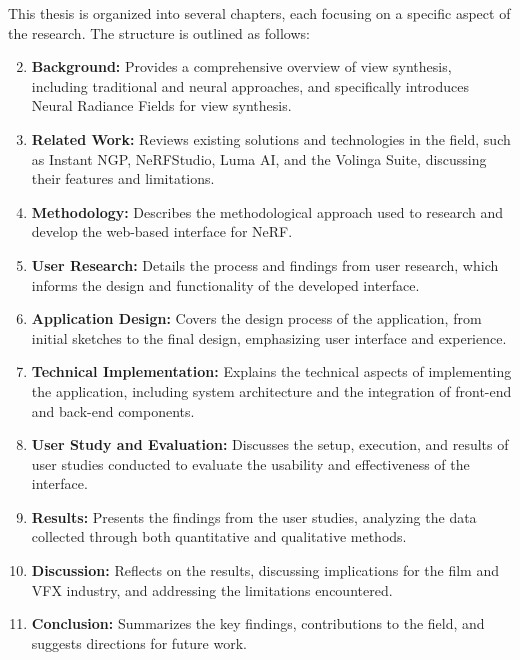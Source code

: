 This thesis is organized into several chapters, each focusing on a specific aspect of the research.
The structure is outlined as follows:

\begin{enumerate}
    \setcounter{enumi}{1}
    \item \textbf{Background:} Provides a comprehensive overview of view synthesis, including traditional and neural approaches, and specifically introduces Neural Radiance Fields for view synthesis.
    \item \textbf{Related Work:} Reviews existing solutions and technologies in the field, such as Instant NGP, NeRFStudio, Luma AI, and the Volinga Suite, discussing their features and limitations.
    \item \textbf{Methodology:} Describes the methodological approach used to research and develop the web-based interface for NeRF.
    \item \textbf{User Research:} Details the process and findings from user research, which informs the design and functionality of the developed interface.
    \item \textbf{Application Design:} Covers the design process of the application, from initial sketches to the final design, emphasizing user interface and experience.
    \item \textbf{Technical Implementation:} Explains the technical aspects of implementing the application, including system architecture and the integration of front-end and back-end components.
    \item \textbf{User Study and Evaluation:} Discusses the setup, execution, and results of user studies conducted to evaluate the usability and effectiveness of the interface.
    \item \textbf{Results:} Presents the findings from the user studies, analyzing the data collected through both quantitative and qualitative methods.
    \item \textbf{Discussion:} Reflects on the results, discussing implications for the film and VFX industry, and addressing the limitations encountered.
    \item \textbf{Conclusion:} Summarizes the key findings, contributions to the field, and suggests directions for future work.
\end{enumerate}
